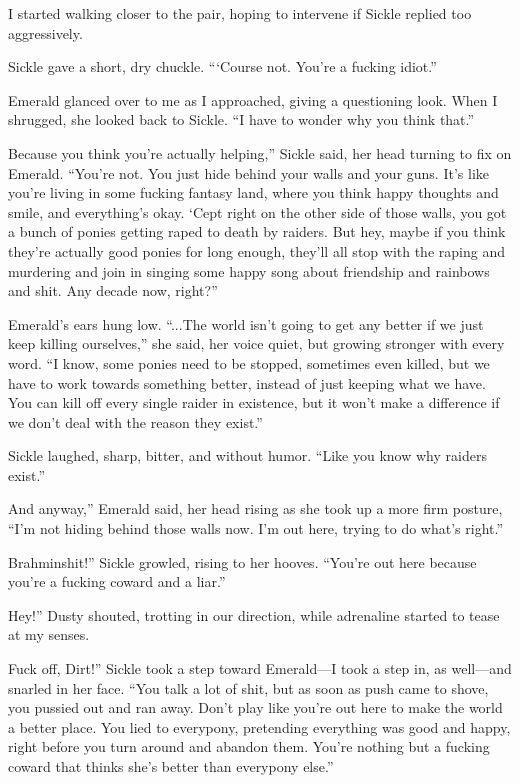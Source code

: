 I started walking closer to the pair, hoping to intervene if Sickle replied too aggressively.

Sickle gave a short, dry chuckle. “‘Course not. You’re a fucking idiot.”

Emerald glanced over to me as I approached, giving a questioning look. When I shrugged, she looked back to Sickle. “I have to wonder why you think that.”

\leavevmode{}Because you think you’re actually helping,” Sickle said, her head turning to fix on Emerald. “You’re not. You just hide behind your walls and your guns. It’s like you’re living in some fucking fantasy land, where you think happy thoughts and smile, and everything’s okay. ‘Cept right on the other side of those walls, you got a bunch of ponies getting raped to death by raiders. But hey, maybe if you think they’re actually good ponies for long enough, they’ll all stop with the raping and murdering and join in singing some happy song about friendship and rainbows and shit. Any decade now, right?”

Emerald’s ears hung low. “...The world isn’t going to get any better if we just keep killing ourselves,” she said, her voice quiet, but growing stronger with every word. “I know, some ponies need to be stopped, sometimes even killed, but we have to work towards something better, instead of just keeping what we have. You can kill off every single raider in existence, but it won’t make a difference if we don’t deal with the reason they exist.”

Sickle laughed, sharp, bitter, and without humor. “Like you know why raiders exist.”

\leavevmode{}And anyway,” Emerald said, her head rising as she took up a more firm posture, “I’m not hiding behind those walls now. I’m out here, trying to do what’s right.”

\leavevmode{}Brahminshit!” Sickle growled, rising to her hooves. “You’re out here because you’re a fucking coward and a liar.”

\leavevmode{}Hey!” Dusty shouted, trotting in our direction, while adrenaline started to tease at my senses.

\leavevmode{}Fuck off, Dirt!” Sickle took a step toward Emerald—I took a step in, as well—and snarled in her face. “You talk a lot of shit, but as soon as push came to shove, you pussied out and ran away. Don’t play like you’re out here to make the world a better place. You lied to everypony, pretending everything was good and happy, right before you turn around and abandon them. You’re nothing but a fucking coward that thinks she’s better than everypony else.”

